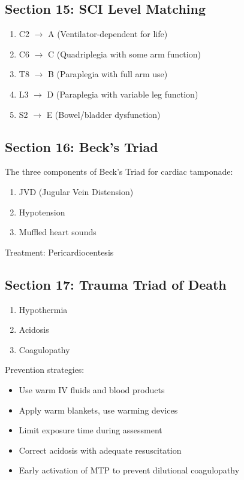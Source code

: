 \documentclass[11pt]{article}
\begin{document}
\subsection*{Section 15: SCI Level Matching}
\begin{enumerate}
    \item C2 $\rightarrow$ A (Ventilator-dependent for life)
    \item C6 $\rightarrow$ C (Quadriplegia with some arm function)
    \item T8 $\rightarrow$ B (Paraplegia with full arm use)
    \item L3 $\rightarrow$ D (Paraplegia with variable leg function)
    \item S2 $\rightarrow$ E (Bowel/bladder dysfunction)
\end{enumerate}

\subsection*{Section 16: Beck's Triad}
The three components of Beck's Triad for cardiac tamponade:
\begin{enumerate}
    \item JVD (Jugular Vein Distension)
    \item Hypotension
    \item Muffled heart sounds
\end{enumerate}

Treatment: Pericardiocentesis

\subsection*{Section 17: Trauma Triad of Death}
\begin{enumerate}
    \item Hypothermia
    \item Acidosis
    \item Coagulopathy
\end{enumerate}

Prevention strategies:
\begin{itemize}
    \item Use warm IV fluids and blood products
    \item Apply warm blankets, use warming devices
    \item Limit exposure time during assessment
    \item Correct acidosis with adequate resuscitation
    \item Early activation of MTP to prevent dilutional coagulopathy
\end{itemize}
\end{document}
